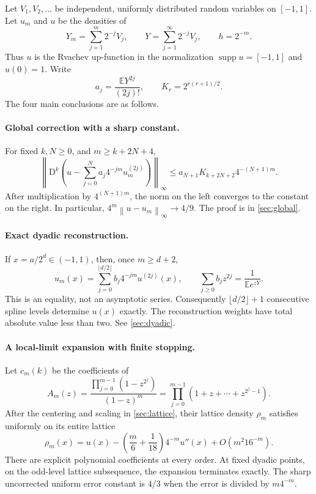 \documentclass[11pt,a4paper]{article}
\numberwithin{equation}{section}
\theoremstyle{definition}
\newcommand{\E}{\mathbb E}
\newcommand{\D}{\mathrm D}
\newcommand{\supp}{\operatorname{supp}}
\newcommand{\norm}[1]{\left\lVert #1\right\rVert}
\begin{document}
Let $V_1,V_2,\ldots$ be independent, uniformly distributed random variables
on $[-1,1]$. Let $u_m$ and $u$ be the densities of
\begin{equation}
 Y_m=\sum_{j=1}^m2^{-j}V_j,
 \qquad
 Y=\sum_{j=1}^{\infty}2^{-j}V_j,
 \qquad h=2^{-m}.
 \label{eq:random-series}
\end{equation}
Thus $u$ is the Rvachev up-function in the normalization
$\supp u=[-1,1]$ and $u(0)=1$. Write
\begin{equation}
 a_j=\frac{\E Y^{2j}}{(2j)!},\qquad
 K_r=2^{r(r+1)/2}.
 \label{eq:a-K}
\end{equation}
The four main conclusions are as follows.

\paragraph{Global correction with a sharp constant.}
For fixed $k,N\geq0$, and $m\geq k+2N+4$,
\begin{equation}
 \left\|\D^k\left(u-\sum_{j=0}^N a_j4^{-jm}u_m^{(2j)}\right)\right\|_\infty
 \leq a_{N+1}K_{k+2N+2}4^{-(N+1)m}.
 \label{eq:intro-strong}
\end{equation}
After multiplication by $4^{(N+1)m}$, the norm on the left converges to
the constant on the right. In particular,
$4^m\norm{u-u_m}_\infty\to4/9$.
The proof is in \cref{sec:global}.

\paragraph{Exact dyadic reconstruction.}
If $x=a/2^d\in(-1,1)$, then, once $m\geq d+2$,
\begin{equation}
 u_m(x)=\sum_{j=0}^{\lfloor d/2\rfloor}b_j4^{-jm}u^{(2j)}(x),
 \qquad \sum_{j\geq0}b_jz^{2j}=\frac1{\E e^{zY}}.
 \label{eq:intro-dyadic}
\end{equation}
This is an equality, not an asymptotic series. Consequently
$\lfloor d/2\rfloor+1$ consecutive spline levels determine $u(x)$ exactly.
The reconstruction weights have total absolute value less than two.
See \cref{sec:dyadic}.

\paragraph{A local-limit expansion with finite stopping.}
Let $c_m(k)$ be the coefficients of
\begin{equation}
 A_m(z)=\frac{\prod_{j=0}^{m-1}(1-z^{2^j})}{(1-z)^m}
       =\prod_{j=0}^{m-1}(1+z+\cdots+z^{2^j-1}).
 \label{eq:intro-Am}
\end{equation}
After the centering and scaling in \cref{sec:lattice}, their lattice
density $\rho_m$ satisfies uniformly on its entire lattice
\begin{equation}
 \rho_m(x)=u(x)-\left(\frac m6+\frac1{18}\right)4^{-m}u''(x)
            +O(m^2 16^{-m}).
 \label{eq:intro-local}
\end{equation}
There are explicit polynomial coefficients at every order. At fixed
dyadic points, on the odd-level lattice subsequence, the expansion
terminates exactly. The sharp uncorrected uniform error constant is
$4/3$ when the error is divided by $m4^{-m}$.
\end{document}

